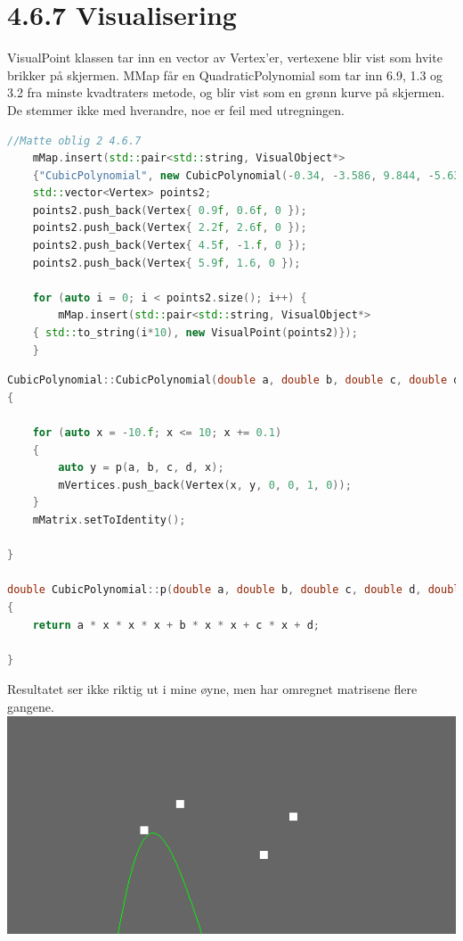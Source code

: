 \documentclass[a4paper,norsk]{article}
\begin{document}
\section{4.6.7 Visualisering}
VisualPoint klassen tar inn en vector av Vertex'er, vertexene blir vist som hvite brikker på skjermen. MMap får en QuadraticPolynomial som tar inn 6.9, 1.3 og 3.2 fra minste kvadtraters metode, og blir vist som en grønn kurve på skjermen.
De stemmer ikke med hverandre, noe er feil med utregningen.
\begin{lstlisting}[language=C++, caption={renderwindow.cpp}]
//Matte oblig 2 4.6.7
    mMap.insert(std::pair<std::string, VisualObject*>
	{"CubicPolynomial", new CubicPolynomial(-0.34, -3.586, 9.844, -5.634,0.1f)});
    std::vector<Vertex> points2;
    points2.push_back(Vertex{ 0.9f, 0.6f, 0 });
    points2.push_back(Vertex{ 2.2f, 2.6f, 0 });
    points2.push_back(Vertex{ 4.5f, -1.f, 0 });
    points2.push_back(Vertex{ 5.9f, 1.6, 0 });
    
    for (auto i = 0; i < points2.size(); i++) {
        mMap.insert(std::pair<std::string, VisualObject*>
	{ std::to_string(i*10), new VisualPoint(points2)});
    }
\end{lstlisting}
\begin{lstlisting}[language=C++, caption={cubicpolynomial.cpp}]
CubicPolynomial::CubicPolynomial(double a, double b, double c, double d, float dx)
{
   
    for (auto x = -10.f; x <= 10; x += 0.1)
    {
        auto y = p(a, b, c, d, x);
        mVertices.push_back(Vertex(x, y, 0, 0, 1, 0));
    }
    mMatrix.setToIdentity();

}

double CubicPolynomial::p(double a, double b, double c, double d, double x)
{
    return a * x * x * x + b * x * x + c * x + d;

}
\end{lstlisting}
Resultatet ser ikke riktig ut i mine øyne, men har omregnet matrisene flere gangene. 
\centering
\includegraphics[width=\textwidth]{MatteOblig2Kubiskinterpolasjon}
\end{document}
